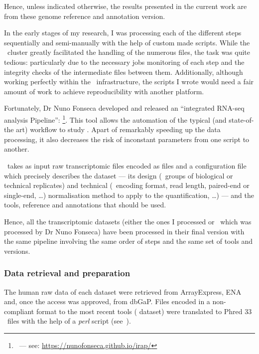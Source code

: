 Hence, unless indicated otherwise, the results presented in the current work are
from these genome reference and annotation version.

In the early stages of my research, I was processing each of the different steps
sequentially and semi-manually with the help of custom made scripts.
While the \EBI\ cluster greatly facilitated the handling of the numerous files,
the task was quite tedious: particularly due to the necessary jobs monitoring of
each step and the integrity checks of the intermediate files between them.
Additionally, although working perfectly within the \EBI\ infrastructure,
the scripts I wrote would need a fair amount of work to achieve reproducibility
with another platform.

Fortunately, Dr Nuno Fonseca developed and released
an ``integrated RNA-seq analysis Pipeline'': \irap\footnote{\irap\ ---
see: \href{https://nunofonseca.github.io/irap/}%
{https://nunofonseca.github.io/irap/}}.
This tool allows the automation of the typical
(and state-of-the art) workflow to study
\Rnaseq. Apart of remarkably speeding up the data processing, it also
decreases the risk of inconstant parameters from one script to another.

\irap\ takes as input raw transcriptomic files encoded as \emph{\fastq}
files and a configuration file which precisely describes the dataset ---
its design (\eg\ groups of biological or
technical replicates) and technical (\eg\ encoding format, read length, paired-end or
single-end, \ldots) normalisation method to apply to the
quantification, \ldots) ---
and the tools, reference and annotations that should be used.
\begin{comment}
While the
configuration is exhaustive and takes time to be written, it is then really easy
to try out different set of parameters.
\end{comment}

Hence, all the transcriptomic datasets (either the ones I processed or \Gtex\
which was processed by Dr Nuno Fonseca) have been processed in their final
version with the same pipeline involving the same order of steps and the same
set of tools and versions.


\subsubsection{Data retrieval and preparation}

The human raw data of each dataset were retrieved from \gls{ArrayExpress},
\gls{ENA} and, once the access was approved, from \gls{dbGaP}.
Files encoded in a non-compliant format to the most recent tools (
dataset) were translated to \gls{Phred} $33$ \fastq\ files with the help of
a \emph{perl} script (see~\Cref{code:fastq}).


